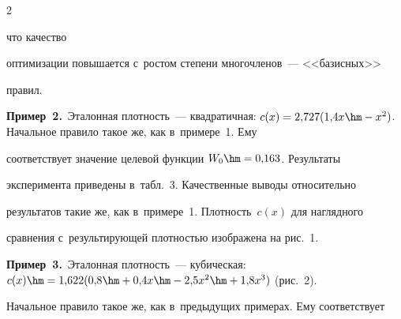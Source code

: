 \begin{multicols}{2}











   


   




   






  


   \noindent


   что качество 


оптимизации повышается с~рос\-том степени многочленов~--- <<базисных>> 


правил.





\smallskip


  


  \noindent


  \textbf{Пример~2.}\ Эталонная плот\-ность~--- квад\-ра\-тич\-ная: $c(x) = 


2{,}727(1{,}4x \hm -x^2)$. Начальное правило такое же, как в~примере~1. Ему 


соответствует значение целевой функции $W_0\hm= 0{,}163$. Результаты 


эксперимента приведены в~табл.~3. Качественные выводы относительно 


результатов такие же, как в~примере~1. Плот\-ность~$c(x)$ для наглядного 


сравнения с~результирующей плот\-ностью  изображена на рис.~1.





\smallskip





 \noindent


   \textbf{Пример~3.}\ Эталонная плот\-ность~--- кубическая: $c(x)\hm= 


1{,}622(0{,}8\hm+0{,}4x\hm- 2{,}5x^2\hm+ 1{,}8x^3)$ (рис.~2).


Начальное правило такое же, как в~предыду\-щих примерах. Ему соответствует 



\end{multicols}
